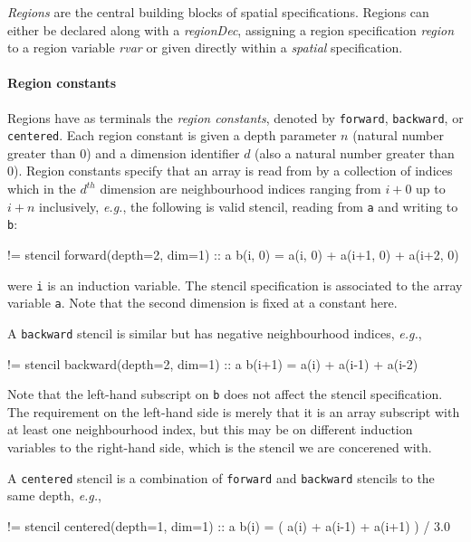 \documentclass[9pt]{sigplanconf}
\newcounter{block}
\theoremstyle{definition}
\newcommand{\eg}{\emph{e.g.}}
\newcommand{\nonterm}[1]{\textit{#1}}
\newcommand{\term}[1]{\texttt{#1}}
\begin{document}
\emph{Regions} are the central building blocks of spatial
specifications. Regions can either be declared along with a
\nonterm{regionDec}, assigning a region specification \nonterm{region} to
a region variable \nonterm{rvar} or given directly within a
\nonterm{spatial} specification.

\paragraph{Region constants}

Regions have as terminals the \emph{region constants}, denoted by 
\term{forward}, \term{backward}, or \term{centered}. Each
region constant is given a depth parameter $n$ (natural number greater
than 0) and a dimension identifier $d$ (also a natural number greater than
0). Region constants specify that an array is read from by a collection
of indices which in the $d^{th}$ dimension are 
neighbourhood indices ranging from $i + 0$ up to $i + n$ inclusively, \eg{}, the
following is valid stencil, reading from \term{a} and writing to \term{b}:
\begin{ExmVerbatim}
!= stencil forward(depth=2, dim=1) :: a
b(i, 0) = a(i, 0) + a(i+1, 0) + a(i+2, 0)
\end{ExmVerbatim}
were \texttt{i} is an induction variable.  The stencil specification
is associated to the array variable \texttt{a}. Note that the second
dimension is fixed at a constant here.

A \term{backward} stencil
is similar but has negative neighbourhood indices, \eg{}, 
%
\begin{ExmVerbatim}
!= stencil backward(depth=2, dim=1) :: a
b(i+1) = a(i) + a(i-1) + a(i-2)
\end{ExmVerbatim}
%
Note that the left-hand subscript on \term{b} does not affect
the stencil specification. The requirement on the left-hand side
is merely that it is an array subscript with at least one neighbourhood index,
but this may be on different induction variables to the right-hand
side, which is the stencil we are concerened with. 

A \texttt{centered} stencil is a combination of \texttt{forward}
and \texttt{backward} stencils to the same depth, \eg{},
\begin{ExmVerbatim}
!= stencil centered(depth=1, dim=1) :: a
b(i) = ( a(i) + a(i-1) + a(i+1) ) / 3.0
\end{ExmVerbatim}
\end{document}
